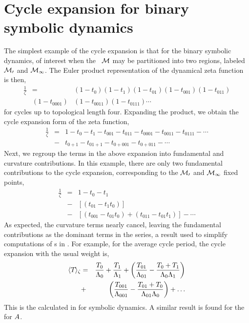 \documentclass[aps,pre,
                showpacs,
                twocolumn,
                groupedaddress,
                superscriptaddress,
                floatfix]{revtex4-1}
\begin{document}
\appendix

\section{Cycle expansion for binary symbolic dynamics}
\label{appe:cyclBinarySymbolic}

The simplest example of the cycle expansion is that for the binary
symbolic dynamics, of interest when the \statesp\ $\cal M$ may be partitioned
into two regions, labeled $\cal M_{0}$ and $\cal M_{1}$. The Euler product
representation of the dynamical zeta function is then,
\begin{eqnarray*}
\frac{1}{\zeta} &=& (1 - t_{0})(1-t_{1})(1-t_{01})(1-t_{001})(1-t_{011})
\\ &(1-t_{0001})&(1-t_{0011})(1-t_{0111})\cdots
\end{eqnarray*}
for cycles up to topological length four. Expanding the product, we
obtain the cycle expansion form of the zeta function,
\begin{eqnarray*}
\frac{1}{\zeta}
&=& 1 - t_{0} - t_{1} - t_{001} - t_{011} - t_{0001} - t_{0011} - t_{0111} - \cdots
\\
&-& t_{0+1} - t_{01+1} - t_{0+001} - t_{0+011} - \cdots
\end{eqnarray*}
Next, we regroup the terms in the above expansion into fundamental and
curvature contributions. In this example, there are only two fundamental
contributions to the cycle expansion, corresponding to the $\cal M_{0}$ and
$\cal M_{1}$ fixed points,
\begin{eqnarray*}
\frac{1}{\zeta} &=& 1 - t_{0} - t_{1} \\
&-& [(t_{01} - t_{1}t_{0})] \\
&-& [(t_{001} - t_{01}t_{0}) + (t_{011} - t_{01}t_{1})] - \cdots
\end{eqnarray*}
As expected, the curvature terms nearly cancel, leaving the fundamental
contributions as the dominant terms in the series, a result used to
simplify computations of {\cycForm s} in . For example,
for the average cycle period, the cycle expansion with the usual weight
is,
\begin{eqnarray*}
\langle {{\ensuremath{T_{}}}} \rangle_{\zeta}
&=& \frac{T_{0}}{\Lambda_{0}} + \frac{T_{1}}{\Lambda_{1}}
+   \left( \frac{T_{01}}{\Lambda_{01}}-\frac{T_{0} + T_{1}}{\Lambda_{0}\Lambda_{1}}\right)
\\
&+& \left( \frac{T_{001}}{\Lambda_{001}}-\frac{T_{01} + T_{0}}{\Lambda_{01}\Lambda_{0}}\right)
+\dots
\end{eqnarray*}
This is the {\cycForm} calculated in 
for symbolic dynamics. A similar result is found for the {\cycForm} for $A$.
\end{document}
